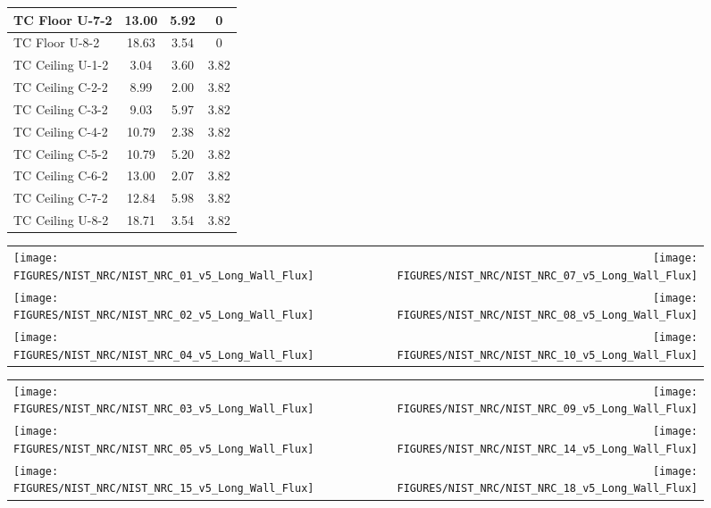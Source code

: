 \begin{figure}[h!]
\begin{center}
\begin{tabular}{|l|c|c|c|}
TC Floor U-7-2    & 13.00 & 5.92 & 0 \\ \hline
TC Floor U-8-2    & 18.63 & 3.54 & 0 \\ \hline
TC Ceiling U-1-2  & 3.04  & 3.60 & 3.82 \\ \hline
TC Ceiling C-2-2  & 8.99  & 2.00 & 3.82 \\ \hline
TC Ceiling C-3-2  & 9.03  & 5.97 & 3.82 \\ \hline
TC Ceiling C-4-2  & 10.79 & 2.38 & 3.82 \\ \hline
TC Ceiling C-5-2  & 10.79 & 5.20 & 3.82 \\ \hline
TC Ceiling C-6-2  & 13.00 & 2.07 & 3.82 \\ \hline
TC Ceiling C-7-2  & 12.84 & 5.98 & 3.82 \\ \hline
TC Ceiling U-8-2  & 18.71 & 3.54 & 3.82 \\ \hline
\end{tabular}
\end{center}
\end{figure}


\begin{figure}[p]
\begin{tabular*}{\textwidth}{l@{\extracolsep{\fill}}r}
\texttt{[image: FIGURES/NIST\_NRC/NIST\_NRC\_01\_v5\_Long\_Wall\_Flux]} &
\texttt{[image: FIGURES/NIST\_NRC/NIST\_NRC\_07\_v5\_Long\_Wall\_Flux]} \\
\texttt{[image: FIGURES/NIST\_NRC/NIST\_NRC\_02\_v5\_Long\_Wall\_Flux]} &
\texttt{[image: FIGURES/NIST\_NRC/NIST\_NRC\_08\_v5\_Long\_Wall\_Flux]} \\
\texttt{[image: FIGURES/NIST\_NRC/NIST\_NRC\_04\_v5\_Long\_Wall\_Flux]} &
\texttt{[image: FIGURES/NIST\_NRC/NIST\_NRC\_10\_v5\_Long\_Wall\_Flux]} \\
\end{tabular*}
\label{NIST_NRC_Long_Wall_Flux_Closed}
\end{figure}

\begin{figure}[p]
\begin{tabular*}{\textwidth}{l@{\extracolsep{\fill}}r}
\texttt{[image: FIGURES/NIST\_NRC/NIST\_NRC\_03\_v5\_Long\_Wall\_Flux]} &
\texttt{[image: FIGURES/NIST\_NRC/NIST\_NRC\_09\_v5\_Long\_Wall\_Flux]} \\
\texttt{[image: FIGURES/NIST\_NRC/NIST\_NRC\_05\_v5\_Long\_Wall\_Flux]} &
\texttt{[image: FIGURES/NIST\_NRC/NIST\_NRC\_14\_v5\_Long\_Wall\_Flux]} \\
\texttt{[image: FIGURES/NIST\_NRC/NIST\_NRC\_15\_v5\_Long\_Wall\_Flux]} &
\texttt{[image: FIGURES/NIST\_NRC/NIST\_NRC\_18\_v5\_Long\_Wall\_Flux]}
\end{tabular*}
\label{NIST_NRC_Long_Wall_Flux_Open}
\end{figure}


